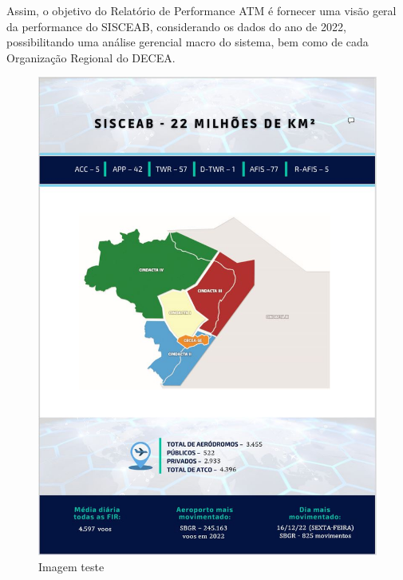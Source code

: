 \documentclass[
]{book}
\begin{document}
Assim, o objetivo do Relatório de Performance ATM é fornecer uma visão geral da performance do SISCEAB, considerando os dados do ano de 2022, possibilitando uma análise gerencial macro do sistema, bem como de cada Organização Regional do DECEA.

\begin{figure}
\centering
\includegraphics{imagens/fig2.jpg}
\caption{Imagem teste}
\end{figure}
\end{document}
